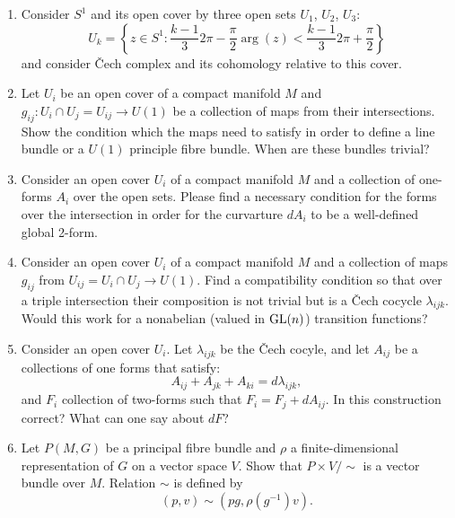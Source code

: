 \documentclass[a4paper,11pt]{article}
\begin{document}
\begin{enumerate}
\item Consider $S^{ 1 }$ and its open cover by three open sets
  $U_{ 1 }$, $U_{ 2 }$, $U_{ 3 }$:
  \begin{equation}
    \label{DiffGeo:06}
    U_{ k } =
    \left\{ z \in S^{ 1 } : \frac{ k - 1 }{ 3 } 2\pi - \frac{ \pi }{ 2 }
      \arg( z ) < \frac{ k - 1 }{ 3 } 2\pi + \frac{ \pi }{ 2 } \right\}
  \end{equation}
  and consider \v{C}ech complex and its cohomology relative to this
  cover.

\item Let $U_{ i }$ be an open cover of a compact manifold $M$ and
  $g_{ i j } : U_{ i } \cap U_{ j } = U_{ i j } \to U( 1 )$ be a
  collection of maps from their intersections. Show the condition
  which the maps need to satisfy in order to define a line bundle or a
  $U( 1 )$ principle fibre bundle. When are these bundles trivial?

\item Consider an open cover $U_{ i }$ of a compact manifold $M$ and a
  collection of one-forms $A_{ i }$ over the open sets. Please find a
  necessary condition for the forms over the intersection in order for
  the curvarture $dA_{ i }$ to be a well-defined global 2-form.

\item Consider an open cover $U_{ i }$ of a compact manifold $M$ and a
  collection of maps $g_{ ij }$ from
  $U_{ ij } = U_{ i } \cap U_{ j } \to U( 1 )$. Find a compatibility
  condition so that over a triple intersection their composition is
  not trivial but is a \v{C}ech cocycle $\lambda_{ i j k }$. Would
  this work for a nonabelian (valued in $\mathrm{GL}( n )$) transition
  functions?

\item Consider an open cover $U_{ i }$. Let $\lambda_{ i j k }$ be the
  \v{C}ech cocyle, and let $A_{ i j }$ be a collections of one forms
  that satisfy:
  \begin{equation}
    \label{eq:DiffGeo-07}
    A_{ i j } + A_{ j k } + A_{ k i } = d\lambda_{ i j k },
  \end{equation}
  and $F_{ i }$ collection of two-forms such that
  $F_{ i } = F_{ j } + dA_{ i j }$. In this construction correct? What
  can one say about $dF$?

\item Let $P( M, G )$ be a principal fibre bundle and $\rho$ a
  finite-dimensional representation of $G$ on a vector space $V$. Show
  that $P \times V / \sim$ is a vector bundle over $M$. Relation
  $\sim$ is defined by
  \begin{equation}
    \label{eq:DiffGeo-09}
    ( p, v ) \sim \left( pg, \rho\left( g^{ -1 } \right) v \right).
  \end{equation}


\end{enumerate}
\end{document}
